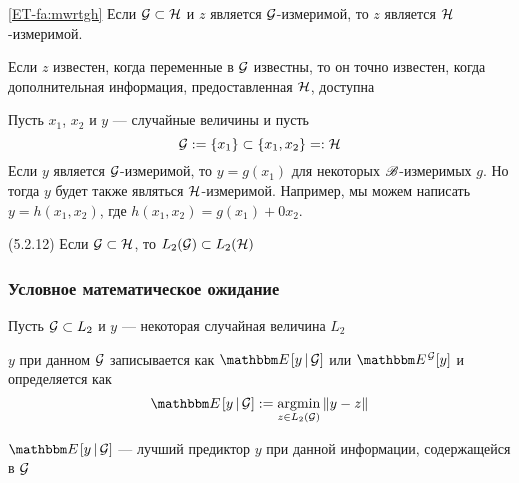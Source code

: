 \begin{frame}

    \vspace{2em}
    \Fact
        \eqref{ET-fa:mwrtgh}
        Если $\mathcal G \subset \mathcal H$ и $z$ является $\mathcal G$-измеримой, то $z$ является
        $\mathcal H$-измеримой.

    Если $z$ известен, когда переменные в $\mathcal G$ известны, 
    то он точно известен, когда дополнительная информация, предоставленная $\mathcal H$, доступна
\end{frame}

\begin{frame}

    \vspace{2em}
    \Eg
    Пусть $x_1$, $x_2$ и $y$ --- случайные величины и пусть 
    \begin{equation*}
         \mathcal G := \{x_1\} \subset \{x_1, x_2\} =: \mathcal H   
    \end{equation*}
    Если $y$ является $\mathcal G$-измеримой, то $y = g(x_1)$ для некоторых $\mathscr B$-измеримых
    $g$. Но тогда $y$ будет также являться $\mathcal H$-измеримой. Например, мы можем
    написать $y = h(x_1,x_2)$, где $h(x_1,x_2) = g(x_1) + 0 x_2$.

    \vspace{2em}
    \Fact (5.2.12)
    Если $\mathcal G \subset \mathcal H$, то $L_2(\mathcal G) \subset L_2(\mathcal H)$
    

\end{frame}

\begin{frame}\frametitle{Условное математическое ожидание}

    \vspace{2em}
    Пусть $\mathcal G \subset L_2$ и
    $y$ --- некоторая случайная величина $L_2$
    
    $y$ при данном $\mathcal G$ записывается как $\EE[ y \given \gG]$ или $\EE^{\gG} [y]$ и определяется как
    \begin{equation}
        \label{eq:defcd}
        \EE [y \given \gG] := \argmin_{z \in L_2(\gG)} \| y - z \|
    \end{equation}
    
    
    $\EE[y \given \gG]$ --- лучший предиктор
    $y$ при данной информации, содержащейся в $\mathcal G$
    
    
\end{frame}

